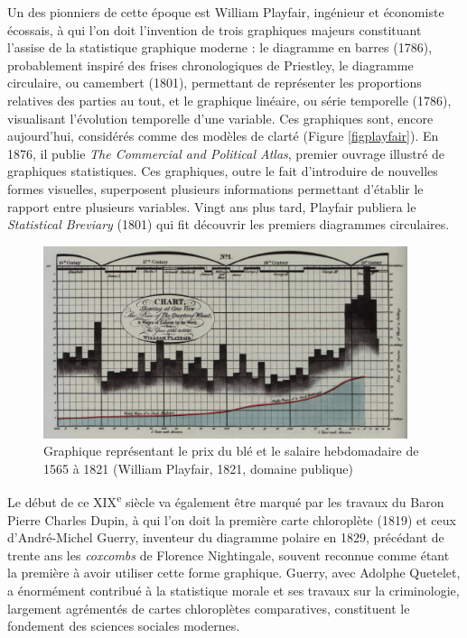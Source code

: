 \documentclass[]{article}
\begin{document}
Un des pionniers de cette époque est William Playfair, ingénieur et économiste écossais, à qui l'on doit l'invention de trois graphiques majeurs constituant l'assise de la statistique graphique moderne : le diagramme en barres (1786), probablement inspiré des frises chronologiques de Priestley, le diagramme circulaire, ou camembert (1801), permettant de représenter les proportions relatives des parties au tout, et le graphique linéaire, ou série temporelle (1786), visualisant l'évolution temporelle d'une variable. Ces graphiques sont, encore aujourd'hui, considérés comme des modèles de clarté (Figure \ref{figplayfair}). En 1876, il publie \emph{The Commercial and Political Atlas}, premier ouvrage illustré de graphiques statistiques. Ces graphiques, outre le fait d'introduire de nouvelles formes visuelles, superposent plusieurs informations permettant d'établir le rapport entre plusieurs variables. Vingt ans plus tard, Playfair publiera le \emph{Statistical Breviary} (1801) qui fit découvrir les premiers diagrammes circulaires.

\begin{figure}
\centering
\includegraphics[width=0.95\textwidth,height=\textheight]{img/chap1/playfair.png}
\caption{Graphique représentant le prix du blé et le salaire hebdomadaire de 1565 à 1821 (William Playfair, 1821, domaine publique)}
\end{figure}

Le début de ce XIX\textsuperscript{e} siècle va également être marqué par les travaux du Baron Pierre Charles Dupin, à qui l'on doit la première carte chloroplète (1819) et ceux d'André-Michel Guerry, inventeur du diagramme polaire en 1829, précédant de trente ans les \emph{coxcombs} de Florence Nightingale, souvent reconnue comme étant la première à avoir utiliser cette forme graphique. Guerry, avec Adolphe Quetelet, a énormément contribué à la statistique morale et ses travaux sur la criminologie, largement agrémentés de cartes chloroplètes comparatives, constituent le fondement des sciences sociales modernes.
\end{document}
